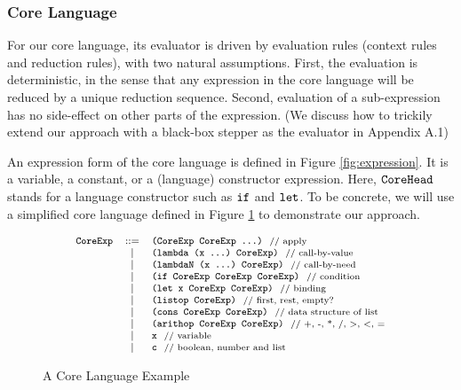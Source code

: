 \subsubsection{Core Language}

For our core language,  its evaluator is driven by evaluation rules (context rules and reduction rules), with two natural assumptions. First, the evaluation is deterministic, in the sense that any expression in the core language will be reduced by a unique reduction sequence. Second, evaluation of a sub-expression has no side-effect on other parts of the expression.
(We discuss how to trickily extend our approach with a black-box stepper as the evaluator in Appendix A.1)

An expression form of the core language is defined in Figure \ref{fig:expression}. It is a variable, a constant, or a (language) constructor expression. Here, $\mbox{\tt CoreHead}$ stands for a language constructor such as $\mbox{\tt if}$ and $\mbox{\tt let}$. To be concrete, we will use a simplified core language defined in Figure \ref{fig:core} to demonstrate our approach.

\begin{figure}[thb]
\begin{centering}
	\[
	{\footnotesize
			\begin{array}{lcl}
			\mbox{\tt CoreExp} &::=& \texttt{(CoreExp~CoreExp~...)} ~~\mbox{{\scriptsize // apply}}\\
			&|& \mbox{\tt (lambda~(x~...)~CoreExp)} ~~\mbox{{\scriptsize // call-by-value}}\\
			&|& \mbox{\tt (lambdaN~(x~...)~CoreExp)} ~~\mbox{{\scriptsize // call-by-need}}\\
			&|& \mbox{\tt (if~CoreExp~CoreExp~CoreExp)} ~~\mbox{{\scriptsize // condition}}\\
			&|& \mbox{\tt (let~x~CoreExp~CoreExp)} ~~\mbox{{\scriptsize // binding}}\\
			&|& \mbox{\tt (listop~CoreExp)} ~~\mbox{{\scriptsize // first, rest, empty?}}\\
			&|& \mbox{\tt (cons~CoreExp~CoreExp)} ~~\mbox{{\scriptsize // data structure of list}}\\
			&|& \mbox{\tt (arithop~CoreExp~CoreExp)} ~~\mbox{{\scriptsize // +, -, *, /, >, <, =}}\\
			&|& \mbox{\tt x} ~~\mbox{{\scriptsize // variable}}\\
			&|& \mbox{\tt c} ~~\mbox{{\scriptsize // boolean, number and list}}
			\end{array}
	}
	\]
\end{centering}
\caption{A Core Language Example}
\label{fig:core}
\end{figure}



